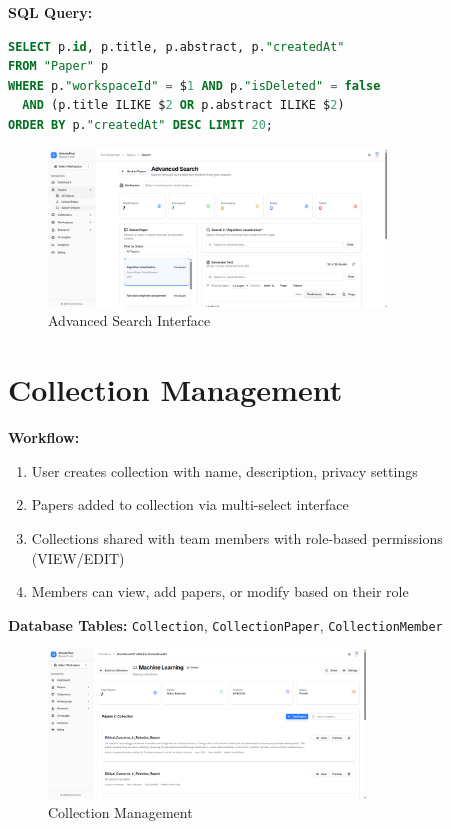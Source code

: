 \textbf{SQL Query:}
\begin{lstlisting}[language=SQL,basicstyle=\tiny\ttfamily]
SELECT p.id, p.title, p.abstract, p."createdAt"
FROM "Paper" p
WHERE p."workspaceId" = $1 AND p."isDeleted" = false
  AND (p.title ILIKE $2 OR p.abstract ILIKE $2)
ORDER BY p."createdAt" DESC LIMIT 20;
\end{lstlisting}

\begin{figure}[H]
\centering
\includegraphics[width=0.8\textwidth]{images/screenshots/advanced_search.png}
\caption{Advanced Search Interface}
\label{fig:search}
\end{figure}

\section{Collection Management}

\textbf{Workflow:}
\begin{enumerate}[leftmargin=*,topsep=3pt,itemsep=2pt]
    \item User creates collection with name, description, privacy settings
    \item Papers added to collection via multi-select interface
    \item Collections shared with team members with role-based permissions (VIEW/EDIT)
    \item Members can view, add papers, or modify based on their role
\end{enumerate}

\textbf{Database Tables:} \texttt{Collection}, \texttt{CollectionPaper}, \texttt{CollectionMember}

\begin{figure}[H]
\centering
\includegraphics[width=0.75\textwidth]{images/screenshots/collection_details.png}
\caption{Collection Management}
\label{fig:collection}
\end{figure}

